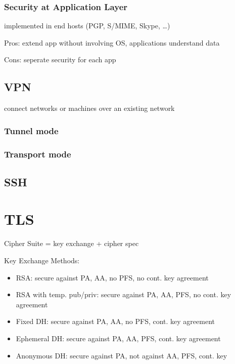 \documentclass[fs, footer]{latex4ei}
\begin{document}
\begin{multicols*}{4}
\subsubsection{Security at Application Layer}

implemented in end hosts (PGP, S/MIME, Skype, \ldots)

Pros: extend app without involving OS, applications understand data

Cons: seperate security for each app

\subsection{VPN}
connect networks or machines over an existing network

\subsubsection{Tunnel mode}

\subsubsection{Transport mode}

\subsection{SSH}


\section{TLS}
Cipher Suite = key exchange + cipher spec

Key Exchange Methods:
\begin{itemize}
	\item RSA:  secure against PA, AA, no PFS, no cont. key agreement
	\item RSA with temp. pub/priv: secure against PA, AA, PFS, no cont. key agreement
	\item Fixed DH: secure against PA, AA, no PFS, cont. key agreement
	\item Ephemeral DH: secure against PA, AA, PFS, cont. key agreement
	\item Anonymous DH: secure against PA, not against AA, PFS, cont. key
\end{itemize}


\end{multicols*}
\end{document}

